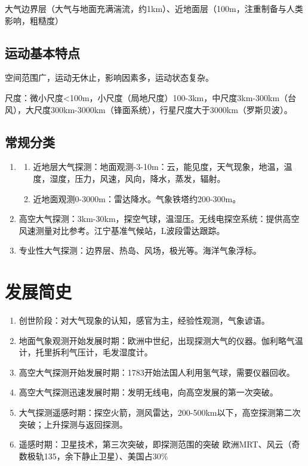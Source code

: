 \documentclass[UTF8,11pt]{ctexbook}
\begin{document}
大气边界层（大气与地面充满湍流，约1km）、近地面层（100m，注重制备与人类影响，粗糙度）

\subsection{运动基本特点}

空间范围广，运动无休止，影响因素多，运动状态复杂。

尺度：微小尺度<100m，小尺度（局地尺度）100-3km，中尺度3km-300km（台风），大尺度300km-3000km（锋面系统），行星尺度大于3000km（罗斯贝波）。

\subsection{常规分类}
\begin{enumerate}
    \item 
    \begin{enumerate}
        \item 近地层大气探测：地面观测-3-10m：云，能见度，天气现象，地温，温度，湿度，压力，风速，风向，降水，蒸发，辐射。
        \item 近地面观测0-3000m：雷达降水。气象铁塔约200-300m。
    \end{enumerate}
    \item 高空大气探测：3km-30km，探空气球，温湿压。无线电探空系统：提供高空风速测量对比参考。江宁基准气候站，L波段雷达跟踪。
    \item 专业性大气探测：边界层、热岛、风场，极光等。海洋气象浮标。
\end{enumerate}

\section{发展简史}
\begin{enumerate}
    \item 创世阶段：对大气现象的认知，感官为主，经验性观测，气象谚语。
    \item 地面气象观测开始发展时期：欧洲中世纪，出现探测大气的仪器。伽利略气温计，托里拆利气压计，毛发湿度计。
    \item 高空大气探测开始发展时期：1783开始法国人利用氢气球，需要仪器回收。
    \item 高空大气探测迅速发展时期：发明无线电，向高空发展的第一次突破。
    \item 大气探测遥感时期：探空火箭，测风雷达，200-500km以下，高空探测第二次突破；上升探测与返回探测。
    \item 遥感时期：卫星技术，第三次突破，即探测范围的突破 欧洲MRT、风云（奇数极轨135，余下静止卫星）、美国占30\%
\end{enumerate}
\end{document}

